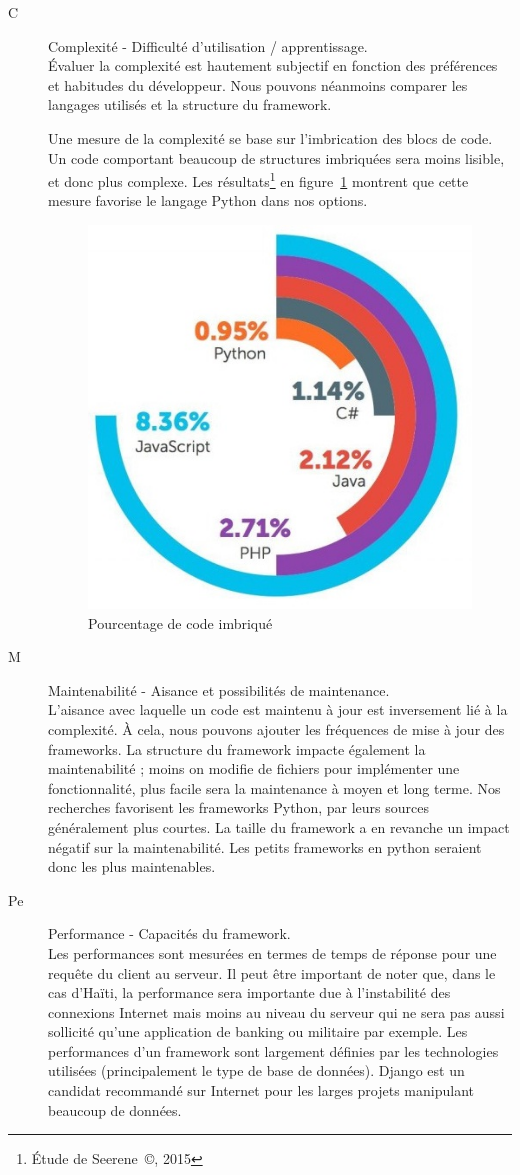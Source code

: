 \documentclass{EPL-master-thesis-covers-FR}
\begin{document}
					\begin{description}
						\item[C] Complexité - Difficulté d'utilisation / apprentissage. \hfill \\
							\'Evaluer la complexité est hautement subjectif en fonction des préférences et habitudes du développeur. Nous pouvons néanmoins comparer les langages utilisés et la structure du framework.

							Une mesure de la complexité se base sur l'imbrication des blocs de code. Un code comportant beaucoup de structures imbriquées sera moins lisible, et donc plus complexe. Les résultats\footnote{\'Etude de Seerene~\copyright, 2015} en figure~\ref{fig:complexity} montrent que cette mesure favorise le langage Python dans nos options.

							\begin{figure}
								\centering
								\includegraphics[width=.4\textwidth]{images/complexity}
								\caption{Pourcentage de code imbriqué}
								\label{fig:complexity}
							\end{figure}

					\item[M] Maintenabilité - Aisance et possibilités de maintenance. \hfill \\
							L'aisance avec laquelle un code est maintenu à jour est inversement lié à la complexité. À cela, nous pouvons ajouter les fréquences de mise à jour des frameworks. La structure du framework impacte également la maintenabilité ; moins on modifie de fichiers pour implémenter une fonctionnalité, plus facile sera la maintenance à moyen et long terme. Nos recherches favorisent les frameworks Python, par leurs sources généralement plus courtes. La taille du framework a en revanche un impact négatif sur la maintenabilité. Les petits frameworks en python seraient donc les plus maintenables.

					\item[Pe] Performance - Capacités du framework. \hfill \\
							Les performances sont mesurées en termes de temps de réponse pour une requête du client au serveur. Il peut être important de noter que, dans le cas d'Haïti, la performance sera importante due à l'instabilité des connexions Internet mais moins au niveau du serveur qui ne sera pas aussi sollicité qu'une application de banking ou militaire par exemple. Les performances d'un framework sont largement définies par les technologies utilisées (principalement le type de base de données). Django est un candidat recommandé sur Internet pour les larges projets manipulant beaucoup de données.


\end{description}
\end{document}
